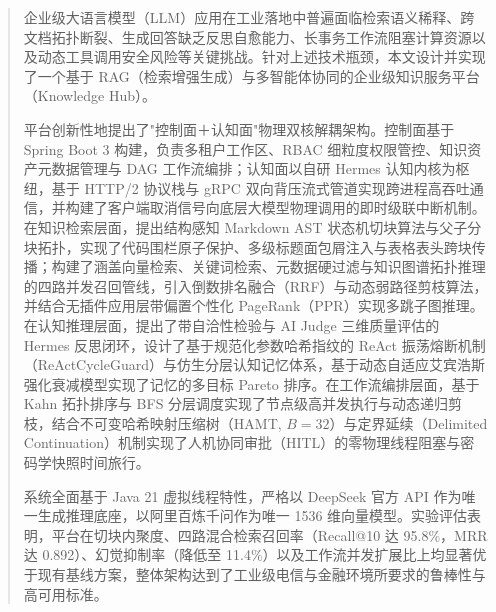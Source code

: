 
\begin{abstract}
    企业级大语言模型（LLM）应用在工业落地中普遍面临检索语义稀释、跨文档拓扑断裂、生成回答缺乏反思自愈能力、长事务工作流阻塞计算资源以及动态工具调用安全风险等关键挑战。针对上述技术瓶颈，本文设计并实现了一个基于 RAG（检索增强生成）与多智能体协同的企业级知识服务平台（Knowledge Hub）。

    平台创新性地提出了"控制面＋认知面"物理双核解耦架构。控制面基于 Spring Boot 3 构建，负责多租户工作区、RBAC 细粒度权限管控、知识资产元数据管理与 DAG 工作流编排；认知面以自研 Hermes 认知内核为枢纽，基于 HTTP/2 协议栈与 gRPC 双向背压流式管道实现跨进程高吞吐通信，并构建了客户端取消信号向底层大模型物理调用的即时级联中断机制。在知识检索层面，提出结构感知 Markdown AST 状态机切块算法与父子分块拓扑，实现了代码围栏原子保护、多级标题面包屑注入与表格表头跨块传播；构建了涵盖向量检索、关键词检索、元数据硬过滤与知识图谱拓扑推理的四路并发召回管线，引入倒数排名融合（RRF）与动态弱路径剪枝算法，并结合无插件应用层带偏置个性化 PageRank（PPR）实现多跳子图推理。在认知推理层面，提出了带自洽性检验与 AI Judge 三维质量评估的 Hermes 反思闭环，设计了基于规范化参数哈希指纹的 ReAct 振荡熔断机制（ReActCycleGuard）与仿生分层认知记忆体系，基于动态自适应艾宾浩斯强化衰减模型实现了记忆的多目标 Pareto 排序。在工作流编排层面，基于 Kahn 拓扑排序与 BFS 分层调度实现了节点级高并发执行与动态递归剪枝，结合不可变哈希映射压缩树（HAMT, $B=32$）与定界延续（Delimited Continuation）机制实现了人机协同审批（HITL）的零物理线程阻塞与密码学快照时间旅行。

    系统全面基于 Java 21 虚拟线程特性，严格以 DeepSeek 官方 API 作为唯一生成推理底座，以阿里百炼千问作为唯一 1536 维向量模型。实验评估表明，平台在切块内聚度、四路混合检索召回率（Recall@10 达 95.8\%，MRR 达 0.892）、幻觉抑制率（降低至 11.4\%）以及工作流并发扩展比上均显著优于现有基线方案，整体架构达到了工业级电信与金融环境所要求的鲁棒性与高可用标准。

\end{abstract}

